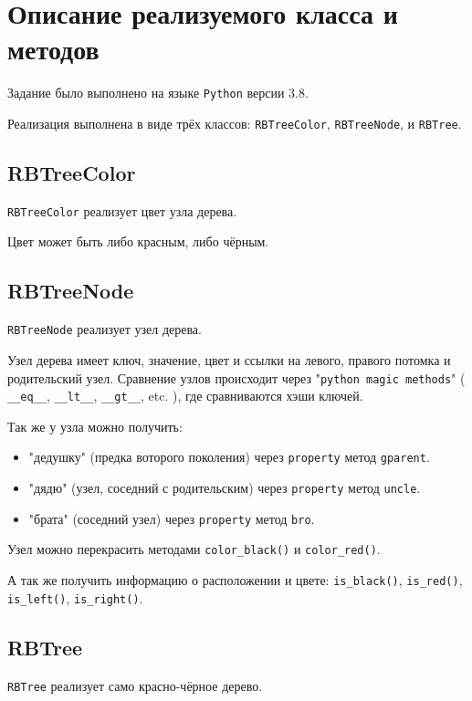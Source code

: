 \section{Описание реализуемого класса и методов}

Задание было выполнено на языке \verb|Python| версии 3.8.

Реализация выполнена в виде трёх классов: 
\verb|RBTreeColor|, \verb|RBTreeNode|, и \verb|RBTree|.

\subsection{RBTreeColor}

\verb|RBTreeColor| реализует цвет узла дерева.

Цвет может быть либо красным, либо чёрным.

\subsection{RBTreeNode}

\verb|RBTreeNode| реализует узел дерева.

Узел дерева имеет ключ, значение, цвет и ссылки на
левого, правого потомка и родительский узел.
Сравнение узлов происходит через "\verb|python magic methods|"
(
\verb|__eq__|, 
\verb|__lt__|, 
\verb|__gt__|, 
etc.
),
где сравниваются хэши ключей.

Так же у узла можно получить:

\begin{itemize}
    \item "дедушку" (предка воторого поколения) через \verb|property| метод \verb|gparent|.
    \item "дядю" (узел, соседний с родительским) через \verb|property| метод \verb|uncle|.
    \item "брата" (соседний узел) через \verb|property| метод \verb|bro|.
\end{itemize}

Узел можно перекрасить методами 
\verb|color_black()| и \verb|color_red()|.

А так же получить информацию о расположении и цвете:
\verb|is_black()|,
\verb|is_red()|,
\verb|is_left()|,
\verb|is_right()|.

\subsection{RBTree}

\verb|RBTree| реализует само красно-чёрное дерево.

